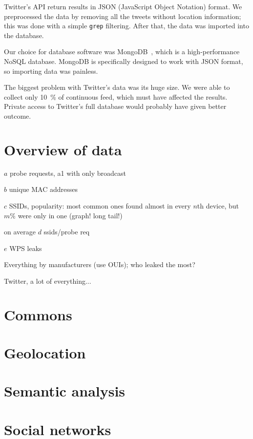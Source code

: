 \documentclass[12pt,a4paper,oneside,pdftex]{report}
\begin{document}
Twitter's API return results in JSON (JavaScript Object Notation) format. We preprocessed the data by removing all the tweets without location information; this was done with a simple \texttt{grep} filtering. After that, the data was imported into the database.

Our choice for database software was MongoDB~\cite{mongodb}, which is a high-performance NoSQL database. MongoDB is specifically designed to work with JSON format, so importing data was painless. 

The biggest problem with Twitter's data was its huge size. We were able to collect only 10~\% of continuous feed, which must have affected the results. Private access to Twitter's full database would probably have given better outcome.

\section{Overview of data}
\label{sec:data_overview}

$a$ probe requests, a1 with only broadcast

$b$ unique MAC addresses

$c$ SSIDs, popularity: most common ones found almost in every $n$th device, but $m \%$ were only in one (graph! long tail!)

on average $d$ ssids/probe req

$e$ WPS leaks

Everything by manufacturers (use OUIs); who leaked the most?

Twitter, a lot of everything...

\section{Commons}
\label{sec:practical_commons}

\section{Geolocation}
\label{sec:practical_geo}

\section{Semantic analysis}
\label{sec:practical_semantic}

\section{Social networks}
\label{sec:practical_social}
\end{document}
